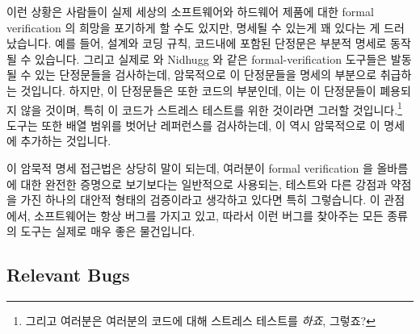 이런 상황은 사람들이 실제 세상의 소프트웨어와 하드웨어 제품에 대한 formal
verification 의 희망을 포기하게 할 수도 있지만, 명세될 수 있는게 꽤 있다는 게
드러났습니다.
예를 들어, 설계와 코딩 규칙, 코드내에 포함된 단정문은 부분적 명세로 동작될 수
있습니다.
그리고 실제로  와 Nidhugg 와 같은 formal-verification 도구들은 발동될
수 있는 단정문들을 검사하는데, 암묵적으로 이 단정문들을 명세의 부분으로
취급하는 것입니다.
하지만, 이 단정문들은 또한 코드의 부분인데, 이는 이 단정문들이 폐용되지 않을
것이며, 특히 이 코드가 스트레스 테스트를 위한 것이라면 그러할
것입니다.\footnote{
	그리고 여러분은 여러분의 코드에 대해 스트레스 테스트를 \emph{하죠},
	그렇죠?}
 도구는 또한 배열 범위를 벗어난 레퍼런스를 검사하는데, 이 역시
암묵적으로 이 명세에 추가하는 것입니다.
\iffalse

This situation might cause one to give up all hope of formal verification
of real-world software and hardware artifacts, but it turns out that there is
quite a bit that can be done.
For example, design and coding rules can act as a partial specification,
as can assertions contained in the code.
And in fact formal-verification tools such as \co{cbmc} and Nidhugg
both check for assertions that can be triggered, implicitly treating
these assertions as part of the specification.
However, the assertions are also part of the code, which makes it less
likely that they will become obsolete, especially if the code is
also subjected to stress tests.\footnote{
	And you \emph{do} stress-test your code, don't you?}
The \co{cbmc} tool also checks for array-out-of-bound references,
thus implicitly adding them to the specification.
\fi

이 암묵적 명세 접근법은 상당히 말이 되는데, 여러분이 formal verification 을
올바름에 대한 완전한 증명으로 보기보다는 일반적으로 사용되는, 테스트와 다른
강점과 약점을 가진 하나의 대안적 형태의 검증이라고 생각하고 있다면 특히
그렇습니다.
이 관점에서, 소프트웨어는 항상 버그를 가지고 있고, 따라서 이런 버그를 찾아주는
모든 종류의 도구는 실제로 매우 좋은 물건입니다.
\iffalse

This implicit-specification approach makes quite a bit of sense, particularly
if you look at formal verification not as a full proof of correctness,
but rather an alternative form of validation with a different set of
strengths and weaknesses than the common case, that is, testing.
From this viewpoint, software will always have bugs, and therefore any
tool of any kind that helps to find those bugs is a very good thing
indeed.
\fi

\subsection{Relevant Bugs}
\label{sec:future:Relevant Bugs}

